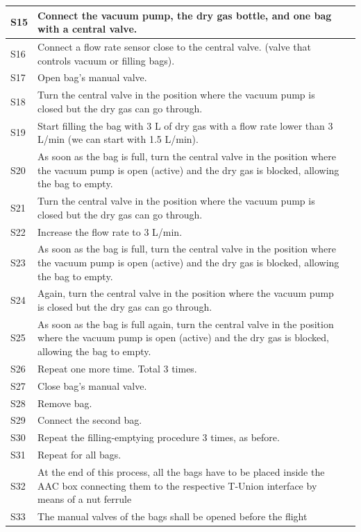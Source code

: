\documentclass[a4paper,12pt,twoside]{article}
\begin{document}
\begin{appendices}
\begin{longtable} {|m{}|m{}|m{}|}
S15 & Connect the vacuum pump, the dry gas bottle, and one bag with a central valve. & \\
\hline
S16 & Connect a flow rate sensor close to the central valve. (valve that controls vacuum or filling bags). & \\
\hline
S17 & Open bag's manual valve. & \\
\hline
S18 & Turn the central valve in the position where the vacuum pump is closed but the dry gas can go through. & \\
\hline
S19 & Start filling the bag with 3 L of dry gas with a flow rate lower than 3 L/min (we can start with 1.5 L/min). & \\
\hline
S20 & As soon as the bag is full, turn the central valve in the position where the vacuum pump is open (active) and the dry gas is blocked, allowing the bag to empty. & \\
\hline
S21 & Turn the central valve in the position where the vacuum pump is closed but the dry gas can go through. & \\
\hline
S22 & Increase the flow rate to 3 L/min. & \\
\hline
S23 & As soon as the bag is full, turn the central valve in the position where the vacuum pump is open (active) and the dry gas is blocked, allowing the bag to empty. & \\
\hline
S24 & Again, turn the central valve in the position where the vacuum pump is closed but the dry gas can go through. & \\
\hline
S25 & As soon as the bag is full again, turn the central valve in the position where the vacuum pump is open (active) and the dry gas is blocked, allowing the bag to empty. & \\
\hline
S26 & Repeat one more time. Total 3 times. & \\
\hline
S27 & Close bag's manual valve. & \\
\hline
S28 & Remove bag. & \\
\hline
S29 & Connect the second bag. & \\
\hline
S30 & Repeat the filling-emptying procedure 3 times, as before. & \\
\hline
S31 & Repeat for all bags. & \\
\hline
S32 & At the end of this process, all the bags have to be placed inside the AAC box connecting them to the respective T-Union interface by means of a nut ferrule & \\
\hline
S33 & The manual valves of the bags shall be opened before the flight & \\

\end{longtable}
\end{appendices}
\end{document}
